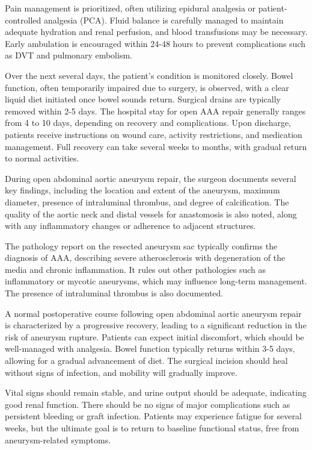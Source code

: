 Pain management is prioritized, often utilizing epidural analgesia or patient-controlled analgesia (PCA). Fluid balance is carefully managed to maintain adequate hydration and renal perfusion, and blood transfusions may be necessary. Early ambulation is encouraged within 24-48 hours to prevent complications such as DVT and pulmonary embolism.

Over the next several days, the patient's condition is monitored closely. Bowel function, often temporarily impaired due to surgery, is observed, with a clear liquid diet initiated once bowel sounds return. Surgical drains are typically removed within 2-5 days. The hospital stay for open AAA repair generally ranges from 4 to 10 days, depending on recovery and complications. Upon discharge, patients receive instructions on wound care, activity restrictions, and medication management. Full recovery can take several weeks to months, with gradual return to normal activities.

During open abdominal aortic aneurysm repair, the surgeon documents several key findings, including the location and extent of the aneurysm, maximum diameter, presence of intraluminal thrombus, and degree of calcification. The quality of the aortic neck and distal vessels for anastomosis is also noted, along with any inflammatory changes or adherence to adjacent structures.

The pathology report on the resected aneurysm sac typically confirms the diagnosis of AAA, describing severe atherosclerosis with degeneration of the media and chronic inflammation. It rules out other pathologies such as inflammatory or mycotic aneurysms, which may influence long-term management. The presence of intraluminal thrombus is also documented.

A normal postoperative course following open abdominal aortic aneurysm repair is characterized by a progressive recovery, leading to a significant reduction in the risk of aneurysm rupture. Patients can expect initial discomfort, which should be well-managed with analgesia. Bowel function typically returns within 3-5 days, allowing for a gradual advancement of diet. The surgical incision should heal without signs of infection, and mobility will gradually improve.

Vital signs should remain stable, and urine output should be adequate, indicating good renal function. There should be no signs of major complications such as persistent bleeding or graft infection. Patients may experience fatigue for several weeks, but the ultimate goal is to return to baseline functional status, free from aneurysm-related symptoms.

